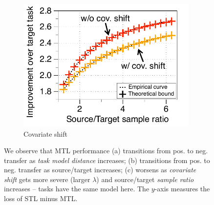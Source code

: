 \begin{figure}[!t]
\begin{subfigure}[b]{0.32\textwidth}
		\centering
		\includegraphics[width=0.98\textwidth]{figures/complementary.pdf}
		\vspace{-0.075in}
		\caption{Covariate shift}
		\label{fig_covariate}
	\end{subfigure}
	\caption{%
	We observe that MTL performance
	(a) transitions from pos. to neg. transfer as \textit{task model distance} increases;
	(b) transitions from pos. to neg. transfer as source/target  increases;
	(c) worsens as \textit{covariate shift} gets more severe (larger $\lambda$) and source/target \textit{sample ratio} increases -- tasks have the same model here.
	The $y$-axis measures the loss of STL minus MTL.
	}
	\label{fig_model_shift_phasetrans}
	\vspace{-0.3in}
\end{figure}






